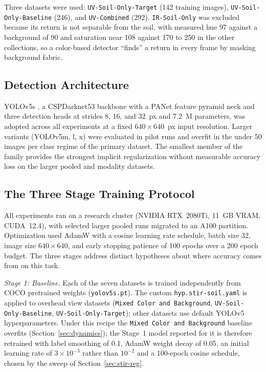 ﻿\documentclass[journal]{IEEEtran}
\begin{document}
Three datasets were used: \texttt{UV-Soil-Only-Target} (142 training images), \texttt{UV-Soil-Only-Baseline} (246), and \texttt{UV-Combined} (292). \texttt{IR-Soil-Only} was excluded because its return is not separable from the soil, with measured hue 97 against a background of 90 and saturation near 108 against 170 to 250 in the other collections, so a color-based detector ``finds'' a return in every frame by masking background fabric.

\subsection{Detection Architecture}
YOLOv5s \cite{jocher2020yolov5}, a CSPDarknet53 backbone with a PANet feature pyramid neck and three detection heads at strides 8, 16, and 32~px and 7.2~M parameters, was adopted across all experiments at a fixed $640 \times 640$~px input resolution. Larger variants (YOLOv5m, l, x) were evaluated in pilot runs and overfit in the under 50 images per class regime of the primary dataset. The smallest member of the family provides the strongest implicit regularization without measurable accuracy loss on the larger pooled and modality datasets.

\subsection{The Three Stage Training Protocol}
All experiments ran on a research cluster (NVIDIA RTX~2080Ti, 11~GB VRAM, CUDA~12.4), with selected larger pooled runs migrated to an A100 partition. Optimization used AdamW with a cosine learning rate schedule, batch size 32, image size $640 \times 640$, and early stopping patience of 100 epochs over a 200 epoch budget. The three stages address distinct hypotheses about where accuracy comes from on this task.

\emph{Stage 1: Baseline.} Each of the seven datasets is trained independently from COCO pretrained weights (\texttt{yolov5s.pt}). The custom \texttt{hyp.stir-soil.yaml} is applied to overhead view datasets (\texttt{Mixed Color and Background}, \texttt{UV-Soil-Only-Baseline}, \texttt{UV-Soil-Only-Target}); other datasets use default YOLOv5 hyperparameters. Under this recipe the \texttt{Mixed Color and Background} baseline overfits (Section~\ref{sec:dynamics}); the Stage~1 model reported for it is therefore retrained with label smoothing of 0.1, AdamW weight decay of 0.05, an initial learning rate of $3 \times 10^{-3}$ rather than $10^{-2}$ and a 100-epoch cosine schedule, chosen by the sweep of Section~\ref{sec:stir-reg}.
\end{document}
